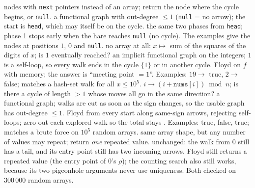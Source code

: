 \begin{variantsbox}
  {nodes with \texttt{next} pointers instead of an array; return the node where the cycle begins, or \texttt{null}.}
  {a functional graph with out-degree $\le 1$ (\texttt{null} = no arrow); the start is \texttt{head}, which may itself be on the cycle.}
  {the same two phases from \texttt{head}; phase 1 stops early when the hare reaches \texttt{null} (no cycle). The examples give the nodes at positions $1$, $0$ and \texttt{null}.}
  {no array at all: $x \mapsto$ sum of the squares of the digits of $x$; is $1$ eventually reached?}
  {an implicit functional graph on the integers; $1$ is a self-loop, so every walk ends in the cycle $\{1\}$ or in another cycle.}
  {Floyd on $f$ with  memory; the answer is ``meeting point $= 1$''. Examples: $19 \to$ true, $2 \to$ false; matches a hash-set walk for all $x \le 10^5$.}
  {$i \to (i + \texttt{nums}[i]) \bmod n$; is there a cycle of length $> 1$ whose moves all go in the same direction?}
  {a functional graph; walks are cut as soon as the sign changes, so the usable graph has out-degree $\le 1$.}
  {Floyd from every start along same-sign arrows, rejecting self-loops; zero out each explored walk so the total stays . Examples: true, false, true; matches a brute force on $10^5$ random arrays.}
  {same array shape, but any number of values may repeat; return \emph{one} repeated value.}
  {unchanged: the walk from $0$ still has a tail, and its entry point still has two incoming arrows.}
  {Floyd still returns a repeated value (the entry point of $0$'s $\rho$); the counting search also still works, because its two pigeonhole arguments never use uniqueness. Both checked on $300\,000$ random arrays.}
\end{variantsbox}
